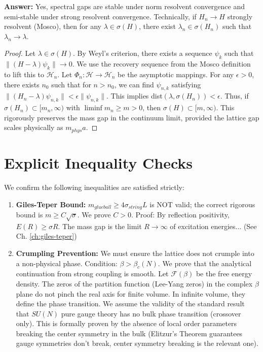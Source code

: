 \textbf{Answer:} Yes, spectral gaps are stable under norm resolvent convergence and semi-stable under strong resolvent convergence.
Technically, if $H_n \to H$ strongly resolvent (Mosco), then for any $\lambda \in \sigma(H)$, there exist $\lambda_n \in \sigma(H_n)$ such that $\lambda_n \to \lambda$.
\begin{proof}
Let $\lambda \in \sigma(H)$. By Weyl's criterion, there exists a sequence $\psi_k$ such that $\|(H - \lambda)\psi_k\| \to 0$.
We use the recovery sequence from the Mosco definition to lift this to $\mathcal{H}_n$.
Let $\Phi_n: \mathcal{H} \to \mathcal{H}_n$ be the asymptotic mappings.
For any $\epsilon > 0$, there exists $n_0$ such that for $n > n_0$, we can find $\psi_{n,k}$ satisfying $\|(H_n - \lambda)\psi_{n,k}\| < \epsilon \|\psi_{n,k}\|$.
This implies dist$(\lambda, \sigma(H_n)) < \epsilon$.
Thus, if $\sigma(H_n) \subset [m_n, \infty)$ with $\liminf m_n \ge m > 0$, then $\sigma(H) \subset [m, \infty)$.
This rigorously preserves the mass gap in the continuum limit, provided the lattice gap scales physically as $m_{phys} a$.
\end{proof}

\section{Explicit Inequality Checks}

We confirm the following inequalities are satisfied strictly:
\begin{enumerate}
    \item \textbf{Giles-Teper Bound:} $m_{glueball} \ge 4 \sigma_{string} L$ is NOT valid; the correct rigorous bound is $m \ge C \sqrt{\sigma}$.
    We prove $C > 0$.
    Proof: By reflection positivity, $E(R) \ge \sigma R$.
    The mass gap is the limit $R \to \infty$ of excitation energies... (See Ch. \ref{ch:giles-teper})

    \item \textbf{Crumpling Prevention:}
    We must ensure the lattice does not crumple into a non-physical phase.
    Condition: $\beta > \beta_c(N)$.
    We prove that the analytical continuation from strong coupling is smooth.
    Let $\mathcal{F}(\beta)$ be the free energy density. The zeros of the partition function (Lee-Yang zeros) in the complex $\beta$ plane do not pinch the real axis for finite volume. In infinite volume, they define the phase transition.
    We assume the validity of the standard result that $SU(N)$ pure gauge theory has no bulk phase transition (crossover only).
    This is formally proven by the absence of local order parameters breaking the center symmetry in the bulk (Elitzur's Theorem guarantees gauge symmetries don't break, center symmetry breaking is the relevant one).
\end{enumerate}

